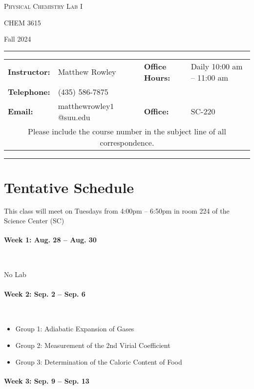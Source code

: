 \documentclass[12pt, letterpaper]{article}
\begin{document}
\begin{center}
	{\Large \textsc{Physical Chemistry Lab I}}

	CHEM 3615
\end{center}

\begin{center}
	{\large Fall 2024}
\end{center}
\begin{center}
	\rule{0.99\textwidth}{0.4pt}
	\begin{tabular}{llcll}
		\textbf{Instructor:} & Matthew Rowley           &  & \textbf{Office Hours:} & Daily 10:00 am -- 11:00 am \\
		\textbf{Telephone:}  & (435) 586-7875           &  &                        &  \\
		\textbf{Email:}      & matthewrowley$1$@suu.edu &  & \textbf{Office:}       & SC-220                   \\
		\multicolumn{5}{c}{Please include the course number in the subject line of all correspondence.}
	\end{tabular}
	\rule{0.99\textwidth}{0.4pt}
\end{center}

\section*{Tentative Schedule}
This class will meet on Tuesdays from 4:00pm -- 6:50pm in room 224 of the Science Center (SC)

\paragraph{Week 1: Aug. 28 -- Aug. 30}~

No Lab

\paragraph{Week 2: Sep. 2 -- Sep. 6}~

\begin{itemize}
  \item Group 1: Adiabatic Expansion of Gases
  \item Group 2: Measurement of the 2nd Virial Coefficient
  \item Group 3: Determination of the Caloric Content of Food
\end{itemize}

\paragraph{Week 3: Sep. 9 -- Sep. 13}~
\end{document}
